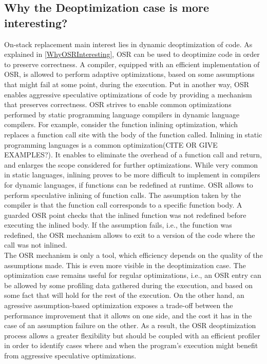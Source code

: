 \subsection{Why the Deoptimization case is more interesting?}
On-stack replacement main interest lies in dynamic deoptimization of code.
As explained in \ref{WhyOSRInteresting}, OSR can be used to deoptimize code in order to preserve correctness.
A compiler, equipped with an efficient implementation of OSR, is allowed to perform adaptive optimizations, based on some assumptions that might fail at some point, during the execution.
Put in another way, OSR enables aggressive speculative optimizations of code by providing a mechanism that preserves correctness.
OSR strives to enable common optimizations performed by static programming language compilers in dynamic language compilers.
For example, consider the function inlining optimization, which replaces a function call site with the body of the function called. 
Inlining in static programming languages is a common optimization(CITE OR GIVE EXAMPLES?).
It enables to eliminate the overhead of a function call and return, and enlarges the scope considered for further optimizations.
While very common in static languages, inlining proves to be more difficult to implement in compilers for dynamic languages, if functions can be redefined at runtime.
OSR allows to perform speculative inlining of function calls. 
The assumption taken by the compiler is that the function call corresponds to a specific function body. 
A guarded OSR point checks that the inlined function was not redefined before executing the inlined body.
If the assumption fails, i.e., the function was redefined, the OSR mechanism allows to exit to a version of the code where the call was not inlined.\\

The OSR mechanism is only a tool, which efficiency depends on the quality of the assumptions made.
This is even more visible in the deoptimization case.
The optimization case remains useful for regular optimizations, i.e., an OSR entry can be allowed by some profiling data gathered during the execution, and based on some fact that will hold for the rest of the execution.
On the other hand, an agressive assumption-based optimization exposes a trade-off between the performance improvement that it allows on one side, and the cost it has in the case of an assumption failure on the other.
As a result, the OSR deoptimization process allows a greater flexibility but should be coupled with an efficient profiler in order to identify cases where and when the program's execution might benefit from aggressive speculative optimizations.\\

